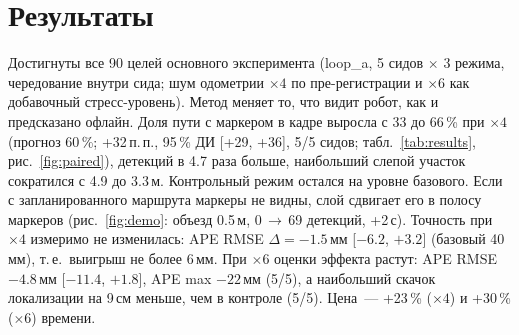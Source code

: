 \documentclass[10pt,twocolumn]{article}
\begin{document}
\section{Результаты}
Достигнуты все 90 целей основного эксперимента (loop\_a, 5 сидов $\times$ 3 режима, чередование внутри сида; шум одометрии ${\times}4$ по пре-регистрации и ${\times}6$ как добавочный стресс-уровень).
Метод меняет то, что видит робот, как и предсказано офлайн. Доля пути с маркером в кадре выросла с 33 до 66\,\% при ${\times}4$ (прогноз 60\,\%; +32\,п.\,п., 95\,\% ДИ [+29, +36], 5/5 сидов; табл.~\ref{tab:results}, рис.~\ref{fig:paired}), детекций в 4.7 раза больше, наибольший слепой участок сократился с 4.9 до 3.3\,м.
Контрольный режим остался на уровне базового. Если с запланированного маршрута маркеры не видны, слой сдвигает его в полосу маркеров (рис.~\ref{fig:demo}: объезд 0.5\,м, 0\,$\to$\,69 детекций, +2\,с).
Точность при ${\times}4$ измеримо не изменилась: APE RMSE $\Delta=-1.5$\,мм [$-6.2$, $+3.2$] (базовый 40\,мм), т.\,е.\ выигрыш не более 6\,мм.
При ${\times}6$ оценки эффекта растут: APE RMSE $-4.8$\,мм [$-11.4$, $+1.8$], APE max $-22$\,мм (5/5), а наибольший скачок локализации на 9\,см меньше, чем в контроле (5/5). Цена~--- +23\,\% (${\times}4$) и +30\,\% (${\times}6$) времени.

\end{document}
